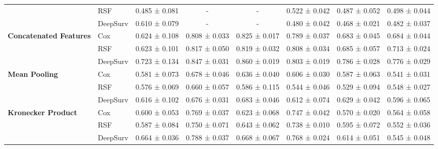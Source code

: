 \begin{sidewaystable}[htbp]
\begin{tabular}{@{}llcccccc@{}}
        & RSF & 0.485 ± 0.081 & - & - & 0.522 ± 0.042 & 0.487 ± 0.052 & 0.498 ± 0.044 \\
        & DeepSurv & 0.610 ± 0.079 & - & - & 0.480 ± 0.042 & 0.468 ± 0.021 & 0.482 ± 0.037 \\
        \midrule
        \multirow{3}{*}{\textbf{Concatenated Features}} & Cox & 0.624 ± 0.108 & 0.808 ± 0.033 & 0.825 ± 0.017 & 0.789 ± 0.037 & 0.683 ± 0.045 & 0.684 ± 0.044 \\
        & RSF & 0.623 ± 0.101 & 0.817 ± 0.050 & 0.819 ± 0.032 & 0.808 ± 0.034 & 0.685 ± 0.057 & 0.713 ± 0.024 \\
        & DeepSurv & 0.723 ± 0.134 & 0.847 ± 0.031 & 0.860 ± 0.019 & 0.803 ± 0.019 & 0.786 ± 0.028 & 0.776 ± 0.029 \\
        \midrule
        \multirow{3}{*}{\textbf{Mean Pooling}} & Cox & 0.581 ± 0.073 & 0.678 ± 0.046 & 0.636 ± 0.040 & 0.606 ± 0.030 & 0.587 ± 0.063 & 0.541 ± 0.031 \\
        & RSF & 0.576 ± 0.069 & 0.660 ± 0.057 & 0.586 ± 0.115 & 0.544 ± 0.046 & 0.529 ± 0.094 & 0.548 ± 0.027 \\
        & DeepSurv & 0.616 ± 0.102 & 0.676 ± 0.031 & 0.683 ± 0.046 & 0.612 ± 0.074 & 0.629 ± 0.042 & 0.596 ± 0.065 \\
        \midrule
        \multirow{3}{*}{\textbf{Kronecker Product}} & Cox & 0.600 ± 0.053 & 0.769 ± 0.037 & 0.623 ± 0.068 & 0.747 ± 0.042 & 0.570 ± 0.020 & 0.564 ± 0.058 \\
        & RSF & 0.587 ± 0.084 & 0.750 ± 0.071 & 0.643 ± 0.062 & 0.738 ± 0.010 & 0.595 ± 0.072 & 0.552 ± 0.036 \\
        & DeepSurv & 0.664 ± 0.036 & 0.788 ± 0.037 & 0.668 ± 0.067 & 0.768 ± 0.024 & 0.614 ± 0.051 & 0.545 ± 0.048 \\
        \bottomrule
    \end{tabular}
\end{sidewaystable}


